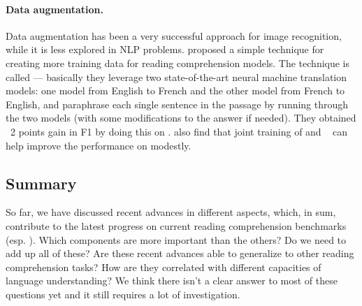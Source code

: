 \paragraph{Data augmentation.} Data augmentation has been a very successful approach for image recognition, while it is less explored in NLP problems.  proposed a simple technique for creating more training data for reading comprehension models. The technique is called  --- basically they leverage two state-of-the-art neural machine translation models: one model from English to French and the other model from French to English, and paraphrase each single sentence in the passage by running through the two models (with some modifications to the answer if needed). They obtained ~2 points gain in F1 by doing this on .  also find that joint training of  and ~\cite{joshi2017triviaqa} can help improve the performance on  modestly.

\subsection{Summary}
So far, we have discussed recent advances in different aspects, which, in sum, contribute to the latest progress on current reading comprehension benchmarks (esp. ). Which components are more important than the others? Do we need to add up all of these? Are these recent advances able to generalize to other reading comprehension tasks? How are they correlated with different capacities of language understanding? We think there isn't a clear answer to most of these questions yet and it still requires a lot of investigation.

